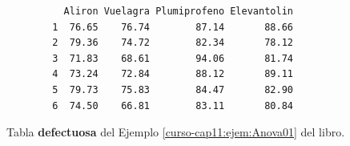 \documentclass[10pt,a4paper]{article}\usepackage[]{graphicx}\usepackage[]{color}
\begin{document}
\begin{table}[ht]
\begin{center}
\begin{minipage}{10cm}
\begin{verbatim}
          Aliron Vuelagra Plumiprofeno Elevantolin
        1  76.65    76.74        87.14       88.66
        2  79.36    74.72        82.34       78.12
        3  71.83    68.61        94.06       81.74
        4  73.24    72.84        88.12       89.11
        5  79.73    75.83        84.47       82.90
        6  74.50    66.81        83.11       80.84
\end{verbatim}
\end{minipage}
\end{center}
\caption{Tabla {\bf defectuosa} del Ejemplo \ref{curso-cap11:ejem:Anova01} del libro.}
\label{tut11:tabla:DefectuosaEjemploAnova01}
\end{table}
\end{document}
